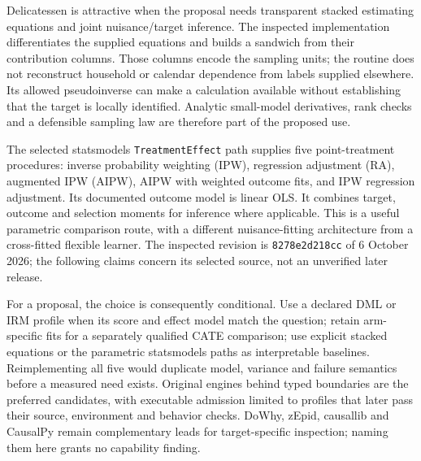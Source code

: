 Delicatessen is attractive when the proposal needs transparent stacked
estimating equations and joint nuisance/target inference. The inspected
implementation differentiates the supplied equations and builds a sandwich
from their contribution columns. Those columns encode the sampling units;
the routine does not reconstruct household or calendar dependence from
labels supplied elsewhere. Its allowed pseudoinverse can make a calculation
available without establishing that the target is locally identified.
Analytic small-model derivatives, rank checks and a defensible sampling law
are therefore part of the proposed use.~\citep{v13_sw_delicatessen,v131_sw_delicatessen}

The selected statsmodels \texttt{TreatmentEffect} path supplies five
point-treatment procedures: inverse probability weighting (IPW), regression
adjustment (RA), augmented IPW (AIPW), AIPW with weighted outcome fits, and
IPW regression adjustment. Its documented outcome model is linear OLS.
It combines target, outcome and selection moments for inference where
applicable. This is a useful parametric comparison route, with a different
nuisance-fitting architecture from a cross-fitted flexible learner.
The inspected revision is \texttt{8278e2d218cc} of 6 October 2026; the
following claims concern its selected source, not an unverified later
release.~\citep{v13_sw_statsmodels,exec20_python_effect_source}

For a proposal, the choice is consequently conditional. Use a declared DML
or IRM profile when its score and effect model match the question; retain
arm-specific fits for a separately qualified CATE comparison; use explicit
stacked equations or the parametric statsmodels paths as interpretable
baselines. Reimplementing all five would duplicate model, variance and
failure semantics before a measured need exists. Original engines behind
typed boundaries are the preferred candidates, with executable admission
limited to profiles that later pass their source, environment and behavior
checks. DoWhy, zEpid, causallib and CausalPy remain complementary leads for
target-specific inspection; naming them here grants no capability finding.

